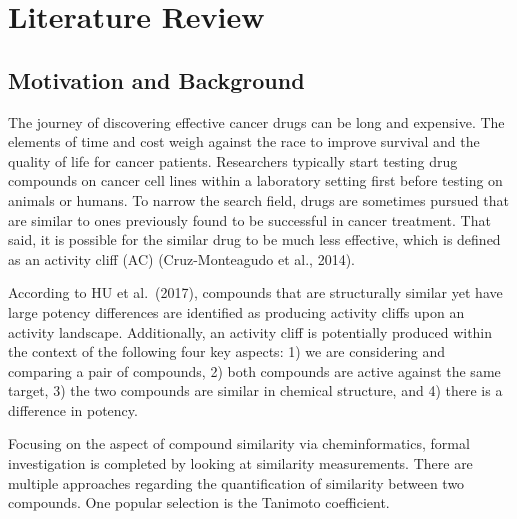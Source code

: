 \documentclass[print]{nuthesis}
\begin{document}

\tableofcontents

\listoffigures
\listoftables

\mainmatter


\hypertarget{literature-review}{%
\chapter{Literature Review}\label{literature-review}}

\hypertarget{motivation-and-background}{%
\section{Motivation and Background}\label{motivation-and-background}}

The journey of discovering effective cancer drugs can be long and expensive. The elements of time and cost weigh against the race to improve survival and the quality of life for cancer patients. Researchers typically start testing drug compounds on cancer cell lines within a laboratory setting first before testing on animals or humans. To narrow the search field, drugs are sometimes pursued that are similar to ones previously found to be successful in cancer treatment. That said, it is possible for the similar drug to be much less effective, which is defined as an activity cliff (AC) (Cruz-Monteagudo et al., 2014).

According to HU et al.~(2017), compounds that are structurally similar yet have large potency differences are identified as producing activity cliffs upon an activity landscape. Additionally, an activity cliff is potentially produced within the context of the following four key aspects: 1) we are considering and comparing a pair of compounds, 2) both compounds are active against the same target, 3) the two compounds are similar in chemical structure, and 4) there is a difference in potency.

Focusing on the aspect of compound similarity via cheminformatics, formal investigation is completed by looking at similarity measurements. There are multiple approaches regarding the quantification of similarity between two compounds. One popular selection is the Tanimoto coefficient.
\end{document}
